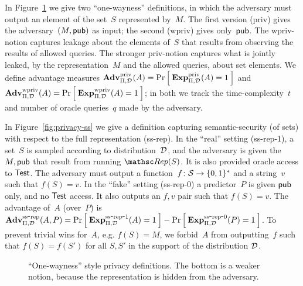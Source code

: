 In Figure~\ref{fig:privacy-ow} we give two ``one-wayness''
definitions, in which the adversary must output an element of the
set~$S$ represented by~$M$.  The first version (priv) gives the
adversary~$(M,{\sf pub})$ as input; the second (wpriv) gives
only~${\sf pub}$.  The wpriv-notion captures leakage about the elements
of~$S$ that results from observing the results of allowed queries.
The stronger priv-notion captures what is jointly leaked, by the
representation~$M$ and the allowed queries, about set elements.  We
define advantage measures $\mathrm{\mathbf{Adv}}^{\mathrm{priv}}_{\Pi,\mathcal{D}_{}^{}}(A) =
\Pr\left[\: \mathrm{\mathbf{Exp}}^{\mathrm{priv}}_{\Pi,\mathcal{D}_{}^{}}(A)=1 \:\right]$ and $\mathrm{\mathbf{Adv}}^{\mathrm{wpriv}}_{\Pi,\mathcal{D}_{}^{}}(A) =
\Pr\left[\: \mathrm{\mathbf{Exp}}^{\mathrm{wpriv}}_{\Pi,\mathcal{D}_{}^{}}(A)=1 \:\right]$; in both we track the
time-complexity~$t$ and number of oracle queries~$q$ made by the adversary.

In Figure~\ref{fig:privacy-ss} we give a definition capturing semantic-security (of sets)
with respect to the full representation (ss-rep).  In the ``real''
setting (ss-rep-1), a set~$S$ is sampled according to distribution~$\mathcal{D}_{}^{}$,
and the adversary is given the~$M,{\sf pub}$ that result from running
$\Rep(S)$.  It is also provided oracle access to $\mathsf{Test}$.
The adversary must output a function~$f\colon{\cal S} \to \{0,1\}^*$ and a
string~$v$ such that $f(S)=v$.  In the ``fake'' setting (ss-rep-0) a
predictor~$P$ is given ${\sf pub}$ only, and no $\mathsf{Test}$ access.  It
also outputs an $f,v$ pair such that $f(S)=v$.  The advantage of~$A$ (over~$P$)
is $\mathrm{\mathbf{Adv}}^{\mathrm{ss\mbox{-}rep}}_{\Pi,\mathcal{D}_{}^{}}(A,P) =
\Pr\left[\: \mathrm{\mathbf{Exp}}^{\mathrm{ss\mbox{-}rep\mbox{-}1}}_{\Pi,\mathcal{D}_{}^{}}(A)=1 \:\right] -
\Pr\left[\: \mathrm{\mathbf{Exp}}^{\mathrm{ss\mbox{-}rep\mbox{-}0}}_{\Pi,\mathcal{D}_{}^{}}(P)=1 \:\right]$.  To prevent trivial wins
for~$A$, e.g. $f(S)=M$, we forbid~$A$ from outputting~$f$
such that $f(S)=f(S')$ for all $S,S'$ in the support of the
distribution $\mathcal{D}_{}^{}$.


\begin{figure}[htbp]
\centering
{}
\caption{``One-wayness'' style privacy
  definitions. The bottom is a weaker notion, because the representation
  is hidden from the adversary.} 
\label{fig:privacy-ow}
\end{figure}

